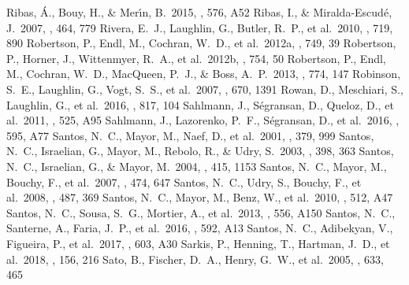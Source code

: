 \documentclass[twocolumn]{aastex62}
\begin{document}
\begin{CJK*}{UTF8}{min}
\begin{thebibliography}{}
 Ribas, {\'A}., Bouy, H., \& Mer{\'{\i}}n, B.\ 2015, \aap, 576, A52
 Ribas, I., \& Miralda-Escud{\'e}, J.\ 2007, \aap, 464, 779
 Rivera, E.~J., Laughlin, G., Butler, R.~P., et al.\ 2010, \apj, 719, 890
 Robertson, P., Endl, M., Cochran, W.~D., et al.\ 2012a, \apj, 749, 39
 Robertson, P., Horner, J., Wittenmyer, R.~A., et al.\ 2012b, \apj, 754, 50
 Robertson, P., Endl, M., Cochran, W.~D., MacQueen, P.~J., \& Boss, A.~P.\ 2013, \apj, 774, 147
 Robinson, S.~E., Laughlin, G., Vogt, S.~S., et al.\ 2007, \apj, 670, 1391
 Rowan, D., Meschiari, S., Laughlin, G., et al.\ 2016, \apj, 817, 104
 Sahlmann, J., S{\'e}gransan, D., Queloz, D., et al.\ 2011, \aap, 525, A95
 Sahlmann, J., Lazorenko, P.~F., S{\'e}gransan, D., et al.\ 2016, \aap, 595, A77
 Santos, N.~C., Mayor, M., Naef, D., et al.\ 2001, \aap, 379, 999
 Santos, N.~C., Israelian, G., Mayor, M., Rebolo, R., \& Udry, S.\ 2003, \aap, 398, 363
 Santos, N.~C., Israelian, G., \& Mayor, M.\ 2004, \aap, 415, 1153
 Santos, N.~C., Mayor, M., Bouchy, F., et al.\ 2007, \aap, 474, 647
 Santos, N.~C., Udry, S., Bouchy, F., et al.\ 2008, \aap, 487, 369
 Santos, N.~C., Mayor, M., Benz, W., et al.\ 2010, \aap, 512, A47
 Santos, N.~C., Sousa, S.~G., Mortier, A., et al.\ 2013, \aap, 556, A150
 Santos, N.~C., Santerne, A., Faria, J.~P., et al.\ 2016, \aap, 592, A13
 Santos, N.~C., Adibekyan, V., Figueira, P., et al.\ 2017, \aap, 603, A30
 Sarkis, P., Henning, T., Hartman, J.~D., et al.\ 2018, \aj, 156, 216
 Sato, B., Fischer, D.~A., Henry, G.~W., et al.\ 2005, \apj, 633, 465

\end{thebibliography}
\end{CJK*}
\end{document}
